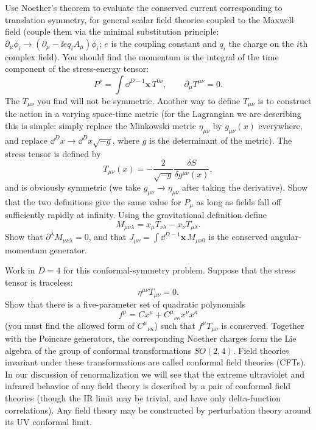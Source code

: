 \begin{banksproblems}
Use Noether's theorem to evaluate the conserved current corresponding to
translation symmetry, for general scalar field theories coupled to the Maxwell
field (couple them via the minimal substitution principle:
$\partial_\mu\phi_i\to(\partial_\mu-\ii e q_i A_\mu)\phi_i$; $e$ is the
coupling constant and $q_i$ the charge on the $i$th complex field). You should
find the momentum is the integral of the time component of the stress-energy
tensor:
\begin{equation*}
  P^\nu=\int\dd^{D-1}\mathbf x\,T^{0\nu},
  \qquad \partial_\mu T^{\mu\nu}=0.
\end{equation*}
The $T_{\mu\nu}$ you find will not be symmetric. Another way to define
$T_{\mu\nu}$ is to construct the action in a varying space-time metric (for
the Lagrangian we are describing this is simple: simply replace the Minkowski
metric $\eta_{\mu\nu}$ by $g_{\mu\nu}(x)$ everywhere, and replace
$\dd^D x\to\dd^D x\sqrt{-g}$, where $g$ is the determinant of the metric). The
stress tensor is defined by
\begin{equation*}
  T_{\mu\nu}(x)=-\frac{2}{\sqrt{-g}}\frac{\delta S}{\delta g^{\mu\nu}(x)},
\end{equation*}
and is obviously symmetric (we take $g_{\mu\nu}\to\eta_{\mu\nu}$ after taking
the derivative). Show that the two definitions give the same value for
$P_\mu$ as long as fields fall off sufficiently rapidly at infinity. Using the
gravitational definition define
\begin{equation*}
  M_{\mu\nu\lambda}=x_\mu T_{\nu\lambda}-x_\nu T_{\mu\lambda}.
\end{equation*}
Show that $\partial^\lambda M_{\mu\nu\lambda}=0$, and that
$J_{\mu\nu}=\int\dd^{D-1}\mathbf x\,M_{\mu\nu0}$ is the conserved angular-momentum
generator.

Work in $D=4$ for this conformal-symmetry problem.
Suppose that the stress tensor is traceless:
\begin{equation*}
  \eta^{\mu\nu}T_{\mu\nu}=0.
\end{equation*}
Show that there is a five-parameter set of quadratic polynomials
\begin{equation*}
  f^\mu=Cx^\mu+C^\mu{}_{\nu\kappa}x^\nu x^\kappa
\end{equation*}
(you must find the allowed form of $C^\mu{}_{\nu\kappa}$) such that
$f^\mu T_{\mu\nu}$ is conserved. Together with the Poincare generators, the
corresponding Noether charges form the Lie algebra of the group of conformal
transformations $SO(2,4)$. Field theories invariant under these transformations
are called conformal field theories (CFTs). In our discussion of renormalization
we will see that the extreme ultraviolet and infrared behavior of any field
theory is described by a pair of conformal field theories (though the IR limit
may be trivial, and have only delta-function correlations). Any field theory
may be constructed by perturbation theory around its UV conformal limit.


\end{banksproblems}
